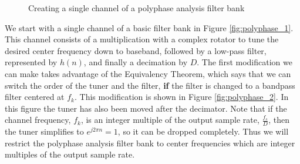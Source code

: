 \documentclass[12pt]{article}
\begin{document}
\begin{figure}[h!]
\centerline{
    \hfill
}
\centerline{
    \hfill
}
\caption{Creating a single channel of a polyphase analysis filter bank}
\label{fig:polyphase_proof}
\end{figure}

We start with a single channel of a basic filter bank in Figure
\ref{fig:polyphase_1}. This channel consists of a multiplication with a complex
rotator to tune the desired center frequency down to baseband, followed by
a low-pass filter, represented by $h(n)$, and finally a decimation by $D$. The
first modification we can make takes advantage of the Equivalency Theorem,
which says that we can switch the order of the tuner and the filter, \textbf{if}
the filter is changed to a bandpass filter centered at $f_k$. This modification
is shown in Figure \ref{fig:polyphase_2}. In this figure the tuner has also
been moved after the decimator. Note that if the channel frequency, $f_k$, is
an integer multiple of the output sample rate, $\frac{f_s}{D}$, then the tuner
simplifies to $e^{j2\pi n} = 1$, so it can be dropped completely.  Thus we will
restrict the polyphase analysis filter bank to center frequencies which are
integer multiples of the output sample rate.
\end{document}
